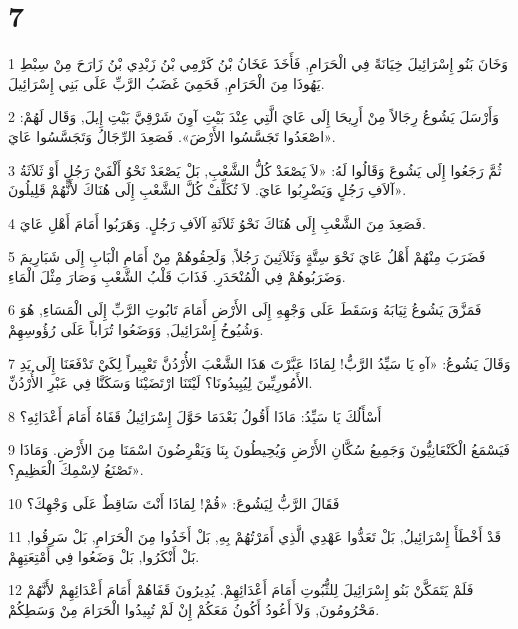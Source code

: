 \chapter{7}

\par 1 وَخَانَ بَنُو إِسْرَائِيلَ خِيَانَةً فِي الْحَرَامِ, فَأَخَذَ عَخَانُ بْنُ كَرْمِي بْنُ زَبْدِي بْنُ زَارَحَ مِنْ سِبْطِ يَهُوذَا مِنَ الْحَرَامِ, فَحَمِيَ غَضَبُ الرَّبِّ عَلَى بَنِي إِسْرَائِيلَ.
\par 2 وَأَرْسَلَ يَشُوعُ رِجَالاً مِنْ أَرِيحَا إِلَى عَايَ الَّتِي عِنْدَ بَيْتِ آوِنَ شَرْقِيَّ بَيْتِ إِيلَ, وَقَال لَهُمْ: «اصْعَدُوا تَجَسَّسُوا الأَرْضَ». فَصَعِدَ الرِّجَالُ وَتَجَسَّسُوا عَايَ.
\par 3 ثُمَّ رَجَعُوا إِلَى يَشُوعَ وَقَالُوا لَهُ: «لاَ يَصْعَدْ كُلُّ الشَّعْبِ, بَلْ يَصْعَدْ نَحْوُ أَلْفَيْ رَجُلٍ أَوْ ثَلاَثَةُ آلاَفِ رَجُلٍ وَيَضْرِبُوا عَايَ. لاَ تُكَلِّفْ كُلَّ الشَّعْبِ إِلَى هُنَاكَ لأَنَّهُمْ قَلِيلُونَ».
\par 4 فَصَعِدَ مِنَ الشَّعْبِ إِلَى هُنَاكَ نَحْوُ ثَلاَثَةِ آلاَفِ رَجُلٍ. وَهَرَبُوا أَمَامَ أَهْلِ عَايَ.
\par 5 فَضَرَبَ مِنْهُمْ أَهْلُ عَايَ نَحْوَ سِتَّةٍ وَثَلاَثِينَ رَجُلاً, وَلَحِقُوهُمْ مِنْ أَمَامِ الْبَابِ إِلَى شَبَارِيمَ وَضَرَبُوهُمْ فِي الْمُنْحَدَرِ. فَذَابَ قَلْبُ الشَّعْبِ وَصَارَ مِثْلَ الْمَاءِ.
\par 6 فَمَزَّقَ يَشُوعُ ثِيَابَهُ وَسَقَطَ عَلَى وَجْهِهِ إِلَى الأَرْضِ أَمَامَ تَابُوتِ الرَّبِّ إِلَى الْمَسَاءِ, هُوَ وَشُيُوخُ إِسْرَائِيلَ, وَوَضَعُوا تُرَاباً عَلَى رُؤُوسِهِمْ.
\par 7 وَقَالَ يَشُوعُ: «آهِ يَا سَيِّدُ الرَّبُّ! لِمَاذَا عَبَّرْتَ هَذَا الشَّعْبَ الأُرْدُنَّ تَعْبِيراً لِكَيْ تَدْفَعَنَا إِلَى يَدِ الأَمُورِيِّينَ لِيُبِيدُونَا؟ لَيْتَنَا ارْتَضَيْنَا وَسَكَنَّا فِي عَبْرِ الأُرْدُنِّ.
\par 8 أَسْأَلُكَ يَا سَيِّدُ: مَاذَا أَقُولُ بَعْدَمَا حَوَّلَ إِسْرَائِيلُ قَفَاهُ أَمَامَ أَعْدَائِهِ؟
\par 9 فَيَسْمَعُ الْكَنْعَانِيُّونَ وَجَمِيعُ سُكَّانِ الأَرْضِ وَيُحِيطُونَ بِنَا وَيَقْرِضُونَ اسْمَنَا مِنَ الأَرْضِ. وَمَاذَا تَصْنَعُ لاِسْمِكَ الْعَظِيمِ؟».
\par 10 فَقَالَ الرَّبُّ لِيَشُوعَ: «قُمْ! لِمَاذَا أَنْتَ سَاقِطٌ عَلَى وَجْهِكَ؟
\par 11 قَدْ أَخْطَأَ إِسْرَائِيلُ, بَلْ تَعَدُّوا عَهْدِي الَّذِي أَمَرْتُهُمْ بِهِ, بَلْ أَخَذُوا مِنَ الْحَرَامِ, بَلْ سَرِقُوا, بَلْ أَنْكَرُوا, بَلْ وَضَعُوا فِي أَمْتِعَتِهِمْ.
\par 12 فَلَمْ يَتَمَكَّنْ بَنُو إِسْرَائِيلَ لِلثُّبُوتِ أَمَامَ أَعْدَائِهِمْ. يُدِيرُونَ قَفَاهُمْ أَمَامَ أَعْدَائِهِمْ لأَنَّهُمْ مَحْرُومُونَ, وَلاَ أَعُودُ أَكُونُ مَعَكُمْ إِنْ لَمْ تُبِيدُوا الْحَرَامَ مِنْ وَسَطِكُمْ.
